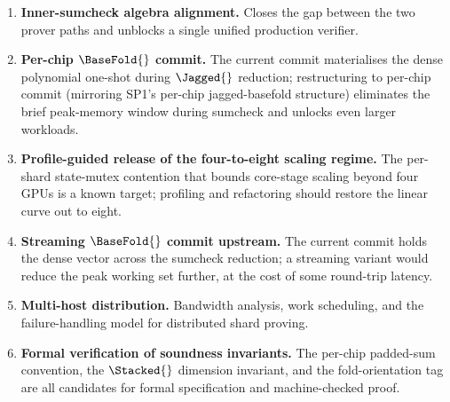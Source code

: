 \begin{enumerate}
  \item \textbf{Inner-sumcheck algebra alignment.} Closes the gap between the two prover paths and unblocks a single unified production verifier.
  \item \textbf{Per-chip $\BaseFold{}$ commit.} The current commit materialises the dense polynomial one-shot during $\Jagged{}$ reduction; restructuring to per-chip commit (mirroring SP1's per-chip jagged-basefold structure) eliminates the brief peak-memory window during sumcheck and unlocks even larger workloads.
  \item \textbf{Profile-guided release of the four-to-eight scaling regime.} The per-shard state-mutex contention that bounds core-stage scaling beyond four GPUs is a known target; profiling and refactoring should restore the linear curve out to eight.
  \item \textbf{Streaming $\BaseFold{}$ commit upstream.} The current commit holds the dense vector across the sumcheck reduction; a streaming variant would reduce the peak working set further, at the cost of some round-trip latency.
  \item \textbf{Multi-host distribution.} Bandwidth analysis, work scheduling, and the failure-handling model for distributed shard proving.
  \item \textbf{Formal verification of soundness invariants.} The per-chip padded-sum convention, the $\Stacked{}$ dimension invariant, and the fold-orientation tag are all candidates for formal specification and machine-checked proof.
\end{enumerate}
